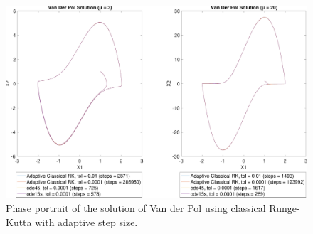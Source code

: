 \begin{figure}[h]
    \centering
    \includegraphics[width=\textwidth]{plots/5_4.pdf}
    \caption{Phase portrait of the solution of Van der Pol using classical Runge-Kutta with adaptive step size.}
    \label{fig:5_4}
\end{figure}






